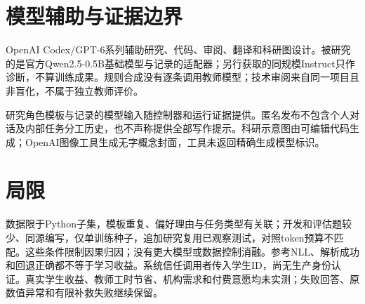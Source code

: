 \section{模型辅助与证据边界}
OpenAI Codex/GPT-6系列辅助研究、代码、审阅、翻译和科研图设计。被研究的是官方Qwen2.5-0.5B基础模型与记录的适配器；另行获取的同规模Instruct只作诊断，不算训练成果。规则合成没有逐条调用教师模型；技术审阅来自同一项目且非盲化，不属于独立教师评价。

研究角色模板与记录的模型输入随控制器和运行证据提供。匿名发布不包含个人对话及内部任务分工历史，也不声称提供全部写作提示。科研示意图由可编辑代码生成；OpenAI图像工具生成无字概念封面，工具未返回精确生成模型标识。

\section{局限}
数据限于Python子集，模板重复、偏好理由与任务类型有关联；开发和评估题较少、同源编写，仅单训练种子，追加研究复用已观察测试，对照token预算不匹配。这些条件限制因果归因；没有更大模型或数据控制消融。参考NLL、解析成功和回退正确都不等于学习收益。系统信任调用者传入学生ID，尚无生产身份认证。真实学生收益、教师工时节省、机构需求和付费意愿均未实测；失败回答、原数值异常和有限补救失败继续保留。
